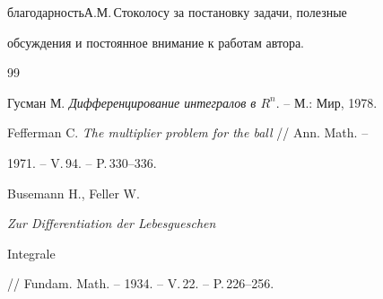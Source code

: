 благодарность\linebreak А.М.\,Стоколосу за постановку задачи, полезные 


обсуждения и постоянное внимание к работам автора. 


 


\begin{thebibliography}{99} 


 




Гусман М. {\em Дифференцирование интегралов в $R^n$}. -- М.: Мир, 1978. 




Fefferman C. {\em The multiplier problem for the ball} // Ann. Math. -- 


1971. -- V.\,94. -- P.\,330--336. 




Busemann H., Feller W. {\em Zur Differentiation der Lebesgueschen 


Integrale} // Fundam. Math. -- 1934. -- V.\,22. -- P.\,226--256. 


 


\end{thebibliography} 


 


\vskip 2cm 


 






 


 


